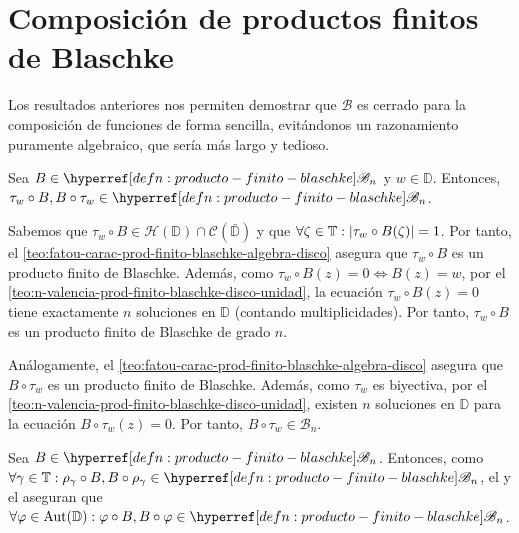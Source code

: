 \section{Composición de productos finitos de Blaschke}

Los resultados anteriores nos permiten demostrar que $\mathscr{B}$ es cerrado para la composición de funciones de forma sencilla, evitándonos un razonamiento puramente algebraico, que sería más largo y tedioso.

\begin{lem}\label{lem:prod-finito-blaschke-composicion-involucion}
    Sea $B \in \exhyperref[defn:producto-finito-blaschke]{producto-finito-blaschke}{\mathscr{B}_n}$ y $w \in \mathbb{D}$. Entonces, $\tau_w \circ B, B \circ \tau_w \in \exhyperref[defn:producto-finito-blaschke]{producto-finito-blaschke}{\mathscr{B}_n}$.
\end{lem}
\begin{dem}
    Sabemos que $\tau_w \circ B \in \mathcal{H}(\mathbb{D}) \cap \mathcal{C}\left(\bar{\mathbb{D}}\right)$ y que $\forall \zeta \in \mathbb{T} : \left|\tau_w \circ B(\zeta)\right| = 1$. Por tanto, el \cref{teo:fatou-carac-prod-finito-blaschke-algebra-disco} asegura que $\tau_w \circ B$ es un producto finito de Blaschke. Además, como $\tau_w \circ B(z) = 0 \iff B(z) = w$, por el \cref{teo:n-valencia-prod-finito-blaschke-disco-unidad}, la ecuación $\tau_w \circ B(z) = 0$ tiene exactamente $n$ soluciones en $\mathbb{D}$ (contando multiplicidades). Por tanto, $\tau_w \circ B$ es un producto finito de Blaschke de grado $n$. 
    
    Análogamente, el \cref{teo:fatou-carac-prod-finito-blaschke-algebra-disco} asegura que $B \circ \tau_w$ es un producto finito de Blaschke. Además, como $\tau_w$ es biyectiva, por el \cref{teo:n-valencia-prod-finito-blaschke-disco-unidad}, existen $n$ soluciones en $\mathbb{D}$ para la ecuación $B \circ \tau_w(z) = 0$. Por tanto, $B \circ \tau_w \in \mathscr{B}_n$.\hfill\qedsymbol
\end{dem}

\begin{obs}\label{obs:prod-finito-blaschke-composicion-automorfismo-disco-unidad}
    Sea $B \in \exhyperref[defn:producto-finito-blaschke]{producto-finito-blaschke}{\mathscr{B}_n}$. Entonces, como $\forall \gamma \in \mathbb{T} : \rho_\gamma \circ B, B \circ \rho_\gamma \in \exhyperref[defn:producto-finito-blaschke]{producto-finito-blaschke}{\mathscr{B}_n}$, el  y el  aseguran que $\forall \varphi \in \mathrm{Aut}(\mathbb{D}) : \varphi \circ B, B \circ \varphi \in \exhyperref[defn:producto-finito-blaschke]{producto-finito-blaschke}{\mathscr{B}_n}$.
\end{obs}

